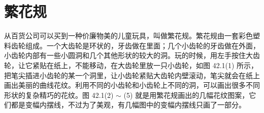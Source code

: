 \section{繁花规}

从百货公司可以买到一种价廉物美的儿童玩具，叫做繁花规。繁花规由一套彩色塑料齿轮组成。一个大齿轮是环状的，牙齿做在里面；几个小齿轮的牙齿做在外面，小齿轮内部有一些小圆洞和几个其他形状的较大的洞。玩的时候，用左手按住大齿轮，让它紧贴在纸上，不能移动，在大齿轮里放一只小齿轮，如图 42.1(1) 所示，把笔尖插进小齿轮的某一个洞里，让小齿轮紧贴大齿轮内壁滚动，笔尖就会在纸上画出美丽的曲线花纹。利用不同的小齿轮和小齿轮上不同的洞，可以画出很多不同形状的复杂精巧的花纹。图 42.1(2) $\sim$ (5) 就是用繁花规画出的几幅花纹图案，它们都是变幅内摆线，不过为了美观，有几幅图中的变幅内摆线只画了一部分。

